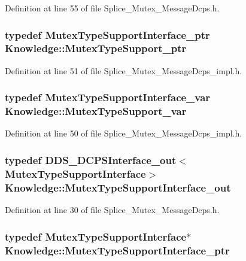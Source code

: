 Definition at line 55 of file Splice\_\-Mutex\_\-MessageDcps.h.

\hypertarget{namespaceKnowledge_af5719967cc28ec0bc5a03cc0ee80fb55}{
\subsubsection[{MutexTypeSupport\_\-ptr}]{\setlength{\rightskip}{0pt plus 5cm}typedef {\bf MutexTypeSupportInterface\_\-ptr} {\bf Knowledge::MutexTypeSupport\_\-ptr}}}
\label{da/d50/namespaceKnowledge_af5719967cc28ec0bc5a03cc0ee80fb55}


Definition at line 51 of file Splice\_\-Mutex\_\-MessageDcps\_\-impl.h.

\hypertarget{namespaceKnowledge_ab12ce85b6674cdb389f8ab17f3e59dd1}{
\subsubsection[{MutexTypeSupport\_\-var}]{\setlength{\rightskip}{0pt plus 5cm}typedef {\bf MutexTypeSupportInterface\_\-var} {\bf Knowledge::MutexTypeSupport\_\-var}}}
\label{da/d50/namespaceKnowledge_ab12ce85b6674cdb389f8ab17f3e59dd1}


Definition at line 50 of file Splice\_\-Mutex\_\-MessageDcps\_\-impl.h.

\hypertarget{namespaceKnowledge_a74243a0d580b4dd8c98e814ddc934733}{
\subsubsection[{MutexTypeSupportInterface\_\-out}]{\setlength{\rightskip}{0pt plus 5cm}typedef DDS\_\-DCPSInterface\_\-out$<$ {\bf MutexTypeSupportInterface}$>$ {\bf Knowledge::MutexTypeSupportInterface\_\-out}}}
\label{da/d50/namespaceKnowledge_a74243a0d580b4dd8c98e814ddc934733}


Definition at line 30 of file Splice\_\-Mutex\_\-MessageDcps.h.

\hypertarget{namespaceKnowledge_aa85dec9fa305b0500bb87231aceb2fb0}{
\subsubsection[{MutexTypeSupportInterface\_\-ptr}]{\setlength{\rightskip}{0pt plus 5cm}typedef {\bf MutexTypeSupportInterface}$\ast$ {\bf Knowledge::MutexTypeSupportInterface\_\-ptr}}}
\label{da/d50/namespaceKnowledge_aa85dec9fa305b0500bb87231aceb2fb0}



